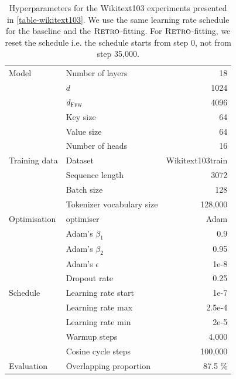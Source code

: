 \documentclass[11pt, a4paper, logo]{deepmind}
\newcommand{\ffw} {\textsc{Ffw}}
\newcommand{\retro}{\textsc{Retro}\xspace}
\begin{document}
\begin{table}[h]
    \caption{Hyperparameters for the Wikitext103 experiments presented in \autoref{table-wikitext103}. We use the same learning rate schedule for the baseline and the $\retro$-fitting. For $\retro$-fitting, we reset the schedule i.e. the schedule starts from step 0, not from step 35,000. }
    
    \small
    \vspace{2.0mm}

    \centering
    \begin{tabular}{l l r} 
    \toprule
      Model & Number of layers & 18 \\
      & $d$ & 1024 \\
      & $d_\ffw$ & 4096 \\ 
      & Key size & 64 \\
      & Value size & 64 \\
      & Number of heads & 16 \\ 

      \midrule
     Training data & Dataset & Wikitext103train \\
      & Sequence length &  3072 \\
      & Batch size & 128 \\
      & Tokenizer vocabulary size & 128,000 \\ \midrule
      Optimisation & optimiser & Adam \\
      & Adam's $\beta_1 $ & 0.9 \\
       & Adam's $\beta_2$ & 0.95 \\
       & Adam's $\epsilon$ & 1e-8 \\
       & Dropout rate & 0.25 \\ \hline
      Schedule  & Learning rate start & 1e-7 \\
       & Learning rate max & 2.5e-4 \\
       & Learning rate min & 2e-5 \\
       & Warmup steps & 4,000 \\
       & Cosine cycle steps & 100,000 \\ \hline
      Evaluation & Overlapping proportion & 87.5 \% \\ 
      \bottomrule
      
    \end{tabular}

    \label{tab:app-wikitext103-hyper}

\end{table}
\end{document}
